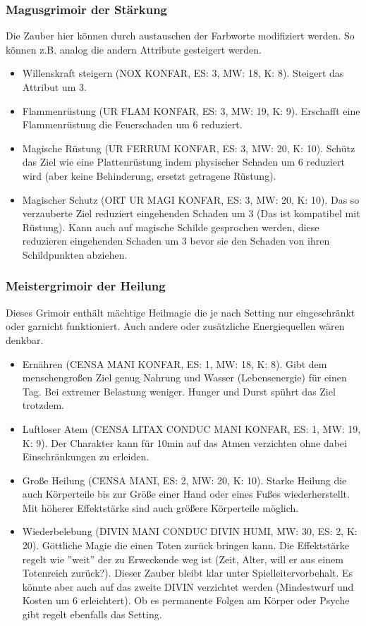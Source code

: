 \documentclass{article}
\begin{document}
\subsubsection{Magusgrimoir der Stärkung}

Die Zauber hier können durch austauschen der Farbworte modifiziert werden. So können z.B. analog die andern Attribute
gesteigert werden.

\begin{itemize}
\item Willenskraft steigern (NOX KONFAR, ES: 3, MW: 18, K: 8). Steigert das Attribut um 3.
\item Flammenrüstung (UR FLAM KONFAR, ES: 3, MW: 19, K: 9). Erschafft eine Flammenrüstung die Feuerschaden um 6 reduziert.
\item Magische Rüstung (UR FERRUM KONFAR, ES: 3, MW: 20, K: 10). Schütz das Ziel wie eine Plattenrüstung indem physischer Schaden um 6 reduziert wird (aber keine Behinderung, ersetzt getragene Rüstung).
\item Magischer Schutz (ORT UR MAGI KONFAR, ES: 3, MW: 20, K: 10). Das so verzauberte Ziel reduziert eingehenden Schaden um 3 (Das ist kompatibel mit Rüstung). Kann auch auf magische Schilde gesprochen werden, diese reduzieren eingehenden Schaden um 3 bevor sie den Schaden von ihren Schildpunkten abziehen.
\end{itemize}

\subsubsection{Meistergrimoir der Heilung}

Dieses Grimoir enthält mächtige Heilmagie die je nach Setting nur eingeschränkt oder garnicht funktioniert. Auch
andere oder zusätzliche Energiequellen wären denkbar.

\begin{itemize}
\item Ernähren (CENSA MANI KONFAR, ES: 1, MW: 18, K: 8). Gibt dem menschengroßen Ziel genug Nahrung und Wasser (Lebensenergie) für einen Tag. Bei extremer Belastung weniger. Hunger und Durst spührt das Ziel trotzdem.
\item Luftloser Atem (CENSA LITAX CONDUC MANI KONFAR, ES: 1, MW: 19, K: 9). Der Charakter kann für 10min auf das Atmen verzichten ohne dabei Einschränkungen zu erleiden.
\item Große Heilung (CENSA MANI, ES: 2, MW: 20, K: 10). Starke Heilung die auch Körperteile bis zur Größe einer Hand oder eines Fußes wiederherstellt. Mit höherer Effektstärke sind auch größere Körperteile möglich.
\item Wiederbelebung (DIVIN MANI CONDUC DIVIN HUMI, MW: 30, ES: 2, K: 20). Göttliche Magie die einen Toten zurück bringen kann. Die Effektstärke regelt wie ''weit'' der zu Erweckende weg ist (Zeit, Alter, will er aus einem Totenreich zurück?). Dieser Zauber bleibt klar unter Spielleitervorbehalt. Es könnte aber auch auf das zweite DIVIN verzichtet werden (Mindestwurf und Kosten um 6 erleichtert). Ob es permanente Folgen am Körper oder Psyche gibt regelt ebenfalls das Setting.
\end{itemize}
\end{document}
